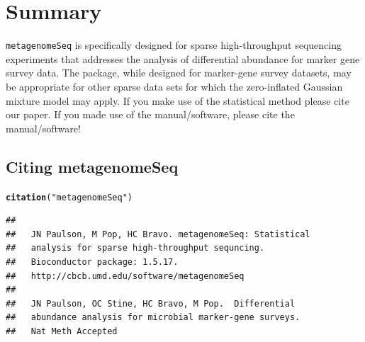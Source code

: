 \documentclass[a4paper,11pt]{article}\usepackage[]{graphicx}\usepackage[]{color}
\makeatletter
\newcommand{\hlstr}[1]{\textcolor[rgb]{0.192,0.494,0.8}{#1}}%
\newcommand{\hlstd}[1]{\textcolor[rgb]{0.345,0.345,0.345}{#1}}%
\newcommand{\hlkwd}[1]{\textcolor[rgb]{0.737,0.353,0.396}{\textbf{#1}}}%
\newenvironment{kframe}{%
 \def\at@end@of@kframe{}%
 \ifinner\ifhmode%
  \def\at@end@of@kframe{\end{minipage}}%
  \begin{minipage}{\columnwidth}%
 \fi\fi%
 \def\FrameCommand##1{\hskip\@totalleftmargin \hskip-\fboxsep
 \colorbox{shadecolor}{##1}\hskip-\fboxsep
     \hskip-\linewidth \hskip-\@totalleftmargin \hskip\columnwidth}%
 \MakeFramed {\advance\hsize-\width
   \@totalleftmargin\z@ \linewidth\hsize
   \@setminipage}}%
 {\par\unskip\endMakeFramed%
 \at@end@of@kframe}
\newenvironment{knitrout}{}{} %
\makeatother
\begin{document}
\newpage
\section{Summary}

\texttt{metagenomeSeq} is specifically designed for sparse high-throughput sequencing experiments that addresses the analysis of differential abundance for marker gene survey data. The package, while designed for marker-gene survey datasets, may be appropriate for other sparse data sets for which the zero-inflated Gaussian mixture model may apply. If you make use of the statistical method please cite our paper. If you made use of the manual/software, please cite the manual/software!

\subsection{Citing metagenomeSeq}
\begin{knitrout}
\color{fgcolor}\begin{kframe}
\begin{alltt}
\hlkwd{citation}\hlstd{(}\hlstr{"metagenomeSeq"}\hlstd{)}
\end{alltt}
\begin{verbatim}
## 
##   JN Paulson, M Pop, HC Bravo. metagenomeSeq: Statistical
##   analysis for sparse high-throughput sequncing.
##   Bioconductor package: 1.5.17.
##   http://cbcb.umd.edu/software/metagenomeSeq
## 
##   JN Paulson, OC Stine, HC Bravo, M Pop.  Differential
##   abundance analysis for microbial marker-gene surveys.
##   Nat Meth Accepted
\end{verbatim}
\end{kframe}
\end{knitrout}
\end{document}
